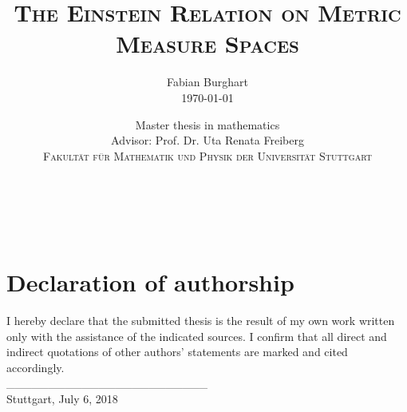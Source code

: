 \documentclass[a4paper,11pt,twoside,notitlepage]{report}
\title{$\ $\\ \textsc{The Einstein Relation on Metric Measure Spaces}\\$\ $}
\author{{\Large {Fabian Burghart}}\\[1em]
  {\large {\today}}\\[10em]}
\date{{\large Master thesis in mathematics}\\
  {\large Advisor: Prof. Dr. Uta Renata Freiberg}\\[7em]
  {\large \textsc{Fakult{\"a}t f{\"u}r Mathematik und Physik der Universit{\"a}t Stuttgart}}}
\begin{document}
\maketitle
\thispagestyle{empty}
\newpage

\thispagestyle{empty}
$\ $

\newpage

\tableofcontents














\printbibliography[heading=bibintoc]

\newpage
\thispagestyle{empty}
$\ $
\newpage
\thispagestyle{empty}
$\ $\\[15em]
\section*{Declaration of authorship}

I hereby declare that the submitted thesis is the result of my own work written only with the assistance of the indicated sources. I confirm that all direct and indirect quotations of other authors' statements are marked and cited accordingly.\\[5em]
\_\_\_\_\_\_\_\_\_\_\_\_\_\_\_\_\_\_\_\_\_\_\_\_\\
Stuttgart, July 6, 2018
\end{document}

